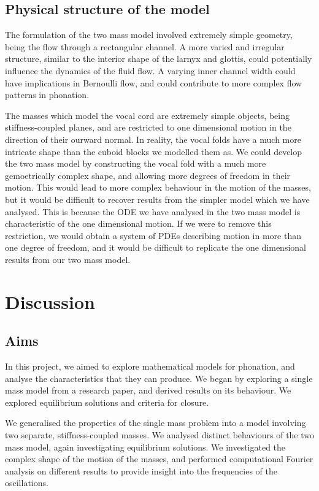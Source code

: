 \documentclass{report}
\begin{document}
\subsection{Physical structure of the model}

The formulation of the two mass model involved extremely simple geometry,
being the flow through a rectangular channel.
A more varied and irregular structure,
similar to the interior shape of the larnyx and glottis,
could potentially influence the dynamics of the fluid flow.
A varying inner channel width could have implications in Bernoulli flow,
and could contribute to more complex flow patterns in phonation.

The masses which model the vocal cord are extremely simple objects,
being stiffness-coupled planes,
and are restricted to one dimensional motion in the direction of their ourward normal.
In reality, the vocal folds have a much more intricate shape than the cuboid blocks we modelled them as.
We could develop the two mass model by constructing the vocal fold with a much more gemoetrically complex shape,
and allowing more degrees of freedom in their motion.
This would lead to more complex behaviour in the motion of the masses,
but it would be difficult to recover results from the simpler model which we have analysed.
This is because the ODE we have analysed in the two mass model is characteristic of the one dimensional motion.
If we were to remove this restriction,
we would obtain a system of PDEs describing motion in more than one degree of freedom,
and it would be difficult to replicate the one dimensional results from our two mass model.

\section{Discussion}

\subsection{Aims}

In this project,
we aimed to explore mathematical models for phonation,
and analyse the characteristics that they can produce.
We began by exploring a single mass model from a research paper,
and derived results on its behaviour.
We explored equilibrium solutions and criteria for closure.

We generalised the properties of the single mass problem into a model involving two separate, stiffness-coupled masses.
We analysed distinct behaviours of the two mass model,
again investigating equilibrium solutions.
We investigated the complex shape of the motion of the masses,
and performed computational Fourier analysis on different results to provide insight into the frequencies of the oscillations.
\end{document}
